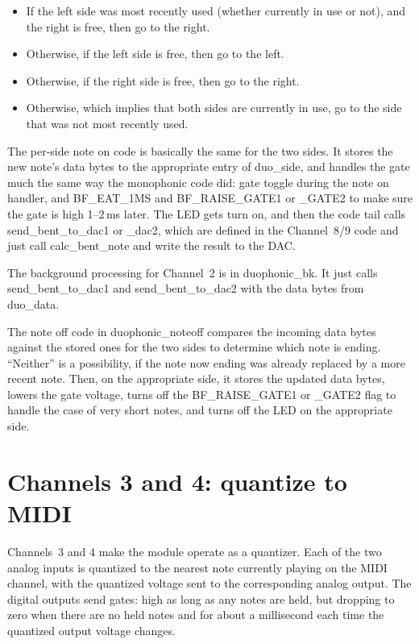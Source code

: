 \begin{itemize}
  \item If the left side was most recently used (whether currently in use or
    not), and the right is free, then go to the right.
  \item Otherwise, if the left side is free, then go to the left.
  \item Otherwise, if the right side is free, then go to the right.
  \item Otherwise, which implies that both sides are currently in use, go to
    the side that was not most recently used.
\end{itemize}

The per-side note on code is basically the same for the two sides.  It
stores the new note's data bytes to the appropriate entry of duo\_side, and
handles the gate much the same way the monophonic code did: gate toggle
during the note on handler, and BF\_EAT\_1MS and BF\_RAISE\_GATE1 or \_GATE2
to make sure the gate is high 1--2\,ms later.  The LED gets turn on, and
then the code tail calls send\_bent\_to\_dac1 or \_dac2, which are defined
in the Channel~8/9 code and just call calc\_bent\_note and write the result
to the DAC.

The background processing for Channel~2 is in duophonic\_bk.  It just calls
send\_bent\_to\_dac1 and send\_bent\_to\_dac2 with the data bytes from
duo\_data.

The note off code in duophonic\_noteoff compares the incoming data bytes
against the stored ones for the two sides to determine which note is ending. 
``Neither'' is a possibility, if the note now ending was already replaced by
a more recent note.  Then, on the appropriate side, it stores the updated
data bytes, lowers the gate voltage, turns off the BF\_RAISE\_GATE1 or
\_GATE2 flag to handle the case of very short notes, and turns off the LED
on the appropriate side.

\section{Channels 3 and 4:  quantize to MIDI}

Channels~3 and 4 make the module operate as a quantizer.  Each of the two
analog inputs is quantized to the nearest note currently playing on the MIDI
channel, with the quantized voltage sent to the corresponding analog output. 
The digital outputs send gates:  high as long as any notes are held, but
dropping to zero when there are no held notes and for about a millisecond
each time the quantized output voltage changes.

